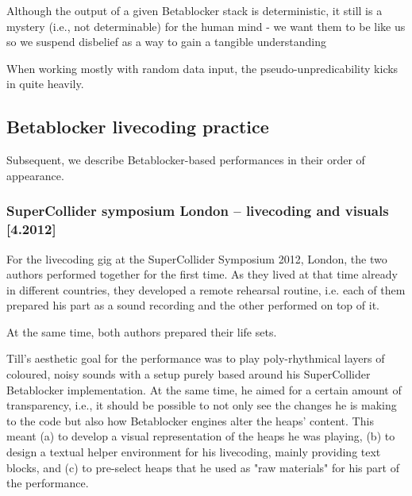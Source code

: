 \documentclass[letterpaper, 12pt]{article}
\begin{document}
Although the output of a given Betablocker stack is deterministic, it still is a mystery (i.e., not determinable) for the human mind - we want them to be like us so we suspend disbelief as a way to gain a tangible understanding

When working mostly with random data input, the pseudo-unpredicability kicks in quite heavily. 



\subsection{Betablocker livecoding practice}
\label{sub:livecoding_performance_practice_influenced_by_betablocker}

% 
% 

Subsequent, we describe Betablocker-based performances in their order of appearance.

\subsubsection{SuperCollider symposium London -- livecoding and visuals [4.2012]}
\label{sub:livecoding_and_visuals}

For the livecoding gig at the SuperCollider Symposium 2012, London, the two authors performed together for the first time. 
As they lived at that time already in different countries, they developed a remote rehearsal routine, i.e. each of them prepared his part as a sound recording and the other performed on top of it.

At the same time, both authors prepared their life sets.

Till's aesthetic goal for the performance was to play poly-rhythmical layers of coloured, noisy sounds with a setup purely based around his SuperCollider Betablocker implementation. 
At the same time, he aimed for a certain amount of transparency, i.e., it should be possible to not only see the changes he is making to the code but also how  Betablocker engines alter the heaps' content.
This meant 
(a) to develop a visual representation of the heaps he was playing, 
(b) to design a textual helper environment for his livecoding, mainly providing text blocks, and
(c) to pre-select heaps that he used as "raw materials" for his part of the  performance.
\end{document}
